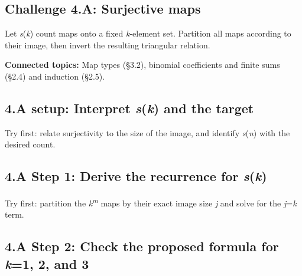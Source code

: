 \documentclass[11pt]{article}
\begin{document}
\begin{keepsection}
\section{Challenge 4.A: Surjective maps}

Let \textit{s}(\textit{k}) count maps onto a fixed \textit{k}-element set. Partition all maps according to their image, then invert the resulting triangular relation.

\textbf{Connected topics:} Map types (§3.2), binomial coefficients and finite sums (§2.4) and induction (§2.5).

\begin{keepsection}
\subsection{4.A setup: Interpret \textit{s}(\textit{k}) and the target}

Try first: relate surjectivity to the size of the image, and identify \textit{s}(\textit{n}) with the desired count.

\end{keepsection}

\begin{keepsection}
\subsection{4.A Step 1: Derive the recurrence for \textit{s}(\textit{k})}

Try first: partition the \textit{k}\textsuperscript{\textit{m}} maps by their exact image size \textit{j} and solve for the \textit{j}=\textit{k} term.

\end{keepsection}

\begin{keepsection}
\subsection{4.A Step 2: Check the proposed formula for \textit{k}=1, 2, and 3}


\end{keepsection}
\end{keepsection}
\end{document}
